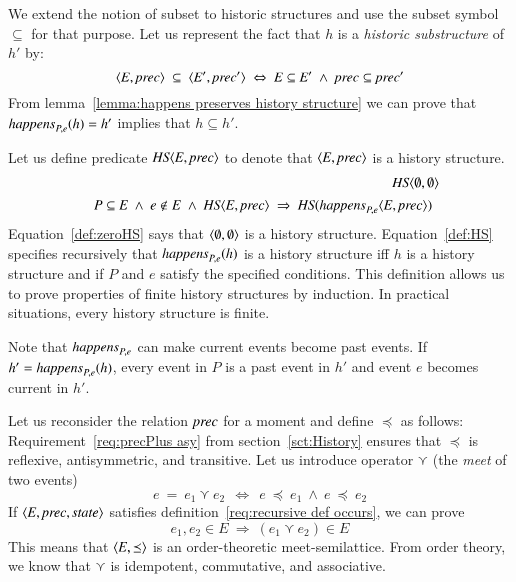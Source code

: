 \documentclass{elsarticle}
\def\id#1{\text{\em #1\/}}
\def\Events{{\mathit E}}
\begin{document}
	We extend the notion of subset to historic structures and use the subset symbol $\subseteq$ for that purpose.
	Let us represent the fact that $h$ is a {\em historic substructure} of $h'$ by:
\begin{equation}
\label{def:historic substructure}
	\la \Events, \id{prec}\ra\ \subseteq\ \la \Events', \id{prec}'\ra\ \Leftrightarrow\ \Events\subseteq\Events'\ \wedge\ \id{prec}\subseteq\id{prec}'
\end{equation}
	From lemma~\ref{lemma:happens preserves history structure} we can prove that $\id{happens}_{P,e}(h)=h'$ implies that $h\subseteq h'$.

	Let us define predicate $\id{HS}\la \Events, \id{prec}\ra$
	to denote that $\la \Events, \id{prec}\ra$ is a history structure.
\begin{eqnarray}
	&&\id{HS}\la \emptyset, \emptyset\ra\label{def:zeroHS}\\
&&\begin{array}{@{}l}
	P\subseteq\Events\ \wedge\ e\notin E\ \wedge\ \id{HS}\la \Events, \id{prec}\ra\ \Rightarrow\ \id{HS}(\id{happens}_{P,e}\la \Events, \id{prec}\ra)
\end{array}
\label{def:HS}
\end{eqnarray}
	Equation~\ref{def:zeroHS} says that $\langle \emptyset, \emptyset\rangle$ is a history structure.
	Equation~\ref{def:HS} specifies recursively that $\id{happens}_{P,e}(h)$ is a history structure iff
	$h$ is a history structure and if $P$ and $e$ satisfy the specified conditions.
	This definition allows us to prove properties of finite history structures by induction.
	In practical situations, every history structure is finite.

	Note that $\id{happens}_{P,e}$ can make current events become past events.
	If $h'=\id{happens}_{P,e}(h)$, every event in $P$ is a past event in $h'$ and event $e$ becomes current in $h'$.

	Let us reconsider the relation $\id{prec}$ for a moment and define $\preceq$ as follows:
	Requirement~\ref{req:precPlus asy} from section~\ref{sct:History} ensures that $\preceq$ is reflexive, antisymmetric, and transitive.
	Let us introduce operator $\curlyvee$ (the {\em meet} of two events)
\begin{equation}
	e\ =\ e_1\curlyvee e_2\ \ \Leftrightarrow\ \ e\ \preceq\ e_1\ \wedge\ e\ \preceq\ e_2
\end{equation}
	If $\la \Events, \id{prec}, \id{state}\ra$ satisfies definition~\ref{req:recursive def occurs},
	we can prove
\begin{equation}
		e_1,e_2\in\Events\ \Rightarrow\ (e_1\curlyvee e_2)\in\Events
\end{equation}
	This means that $\la\Events,\preceq\ra$ is an order-theoretic meet-semilattice.
	From order theory, we know that $\curlyvee$ is idempotent, commutative, and associative.
\end{document}

